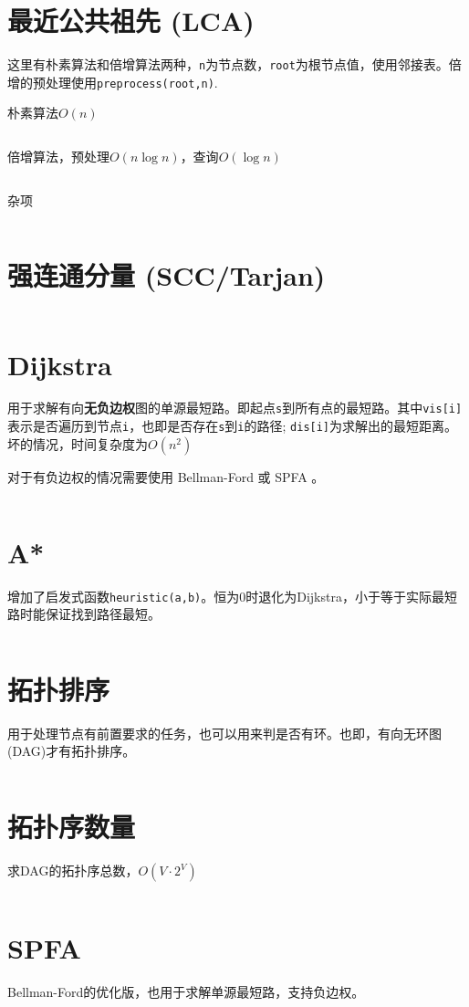 \documentclass[openany,a4paper]{book}
\begin{document}
\section{最近公共祖先 (LCA)}
这里有朴素算法和倍增算法两种，\verb|n|为节点数，\verb|root|为根节点值，使用邻接表。倍增的预处理使用\verb|preprocess(root,n)|.
\par 朴素算法$O(n)$
\inputminted{cpp}{GraphTheory/LCA-1.h}
倍增算法，预处理$O(n\log n)$，查询$O(\log n)$
\inputminted{cpp}{GraphTheory/LCA-2.hpp}
杂项
\inputminted{cpp}{GraphTheory/tree-misc.hpp}

\section{强连通分量 (SCC/Tarjan)}
\inputminted{cpp}{GraphTheory/scc.hpp}

\section{Dijkstra}
用于求解有向\textbf{无负边权}图的单源最短路。即起点\verb|s|到所有点的最短路。其中\verb|vis[i]|表示是否遍历到节点\verb|i|，也即是否存在\verb|s|到\verb|i|的路径; \verb|dis[i]|为求解出的最短距离。坏的情况，时间复杂度为$O(n^2)$
\par 对于有负边权的情况需要使用 Bellman-Ford 或 SPFA 。
\inputminted{cpp}{GraphTheory/Dijkstra.h}

\section{A*}
增加了启发式函数\verb|heuristic(a,b)|。恒为0时退化为Dijkstra，小于等于实际最短路时能保证找到路径最短。
\inputminted{cpp}{GraphTheory/Astar.h}

\section{拓扑排序}
用于处理节点有前置要求的任务，也可以用来判是否有环。也即，有向无环图(DAG)才有拓扑排序。
\inputminted{cpp}{GraphTheory/TopoSort.h}

\section{拓扑序数量}
求DAG的拓扑序总数，$O(V\cdot2^V)$
\inputminted{cpp}{GraphTheory/topoCount.hpp}

\section{SPFA}
Bellman-Ford的优化版，也用于求解单源最短路，支持负边权。
\inputminted{cpp}{GraphTheory/SPFA.h}
\end{document}
